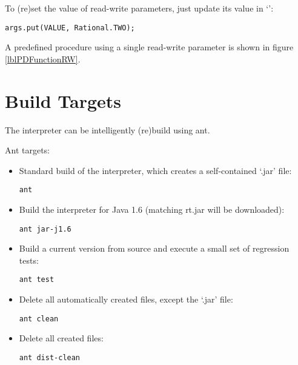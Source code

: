 To (re)set the value of read-write parameters, just update its value in `':
\begin{lstlisting}[frame=none,numbers=none]
args.put(VALUE, Rational.TWO);
\end{lstlisting}

A predefined procedure using a single read-write parameter is shown in figure \ref{lblPDFunctionRW}.


\section{Build Targets}

The interpreter can be intelligently (re)build using ant.

Ant targets:

\begin{itemize}
	\item Standard build of the interpreter, which creates a self-contained `.jar' file:
\begin{lstlisting}[frame=none,numbers=none]
ant
\end{lstlisting}

	\item Build the interpreter for Java 1.6 (matching rt.jar will be downloaded):

\begin{lstlisting}[frame=none,numbers=none]
ant jar-j1.6
\end{lstlisting}

	\item Build a current version from source and execute a small set of regression tests:

\begin{lstlisting}[frame=none,numbers=none]
ant test
\end{lstlisting}

	\item Delete all automatically created files, except the `.jar' file:

\begin{lstlisting}[frame=none,numbers=none]
ant clean
\end{lstlisting}

	\item Delete all created files:

\begin{lstlisting}[frame=none,numbers=none]
ant dist-clean
\end{lstlisting}

\end{itemize}

